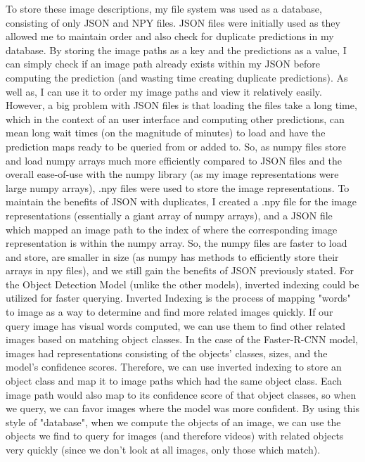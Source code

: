 \documentclass[10pt,twocolumn]{article}
\begin{document}
To store these image descriptions, my file system was used as a database, consisting of only JSON and NPY files. JSON files were initially used as they allowed me to maintain order and also check for duplicate predictions in my database. By storing the image paths as a key and the predictions as a value, I can simply check if an image path already exists within my JSON before computing the prediction (and wasting time creating duplicate predictions). As well as, I can use it to order my image paths and view it relatively easily. However, a big problem with JSON files is that loading the files take a long time, which in the context of an user interface and computing other predictions, can mean long wait times (on the magnitude of minutes) to load and have the prediction maps ready to be queried from or added to. So, as numpy files store and load numpy arrays much more efficiently compared to JSON files \cite{STACKOVERFLOW HERE} and the overall ease-of-use with the numpy library (as my image representations were large numpy arrays), .npy files were used to store the image representations. To maintain the benefits of JSON with duplicates, I created a .npy file for the image representations (essentially a giant array of numpy arrays), and a JSON file which mapped an image path to the index of where the corresponding image representation is within the numpy array. So, the numpy files are faster to load and store, are smaller in size (as numpy has methods to efficiently store their arrays in npy files), and we still gain the benefits of JSON previously stated. For the Object Detection Model (unlike the other models), inverted indexing could be utilized for faster querying. Inverted Indexing is the process of mapping "words" to image as a way to determine and find more related images quickly. If our query image has visual words computed, we can use them to find other related images based on matching object classes. In the case of the Faster-R-CNN model, images had representations consisting of the objects' classes, sizes, and the model's confidence scores. Therefore, we can use inverted indexing to store an object class and map it to image paths which had the same object class. Each image path would also map to its confidence score of that object classes, so when we query, we can favor images where the model was more confident. By using this style of "database", when we compute the objects of an image, we can use the objects we find to query for images (and therefore videos) with related objects very quickly (since we don't look at all images, only those which match).
\end{document}
